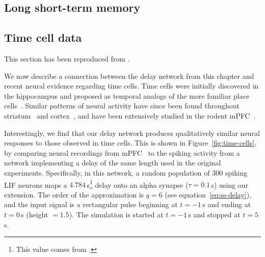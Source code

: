 \subsection{Long short-term memory}
\label{sec:delay-lstm}

\subsection{Time cell data}
\label{sec:time-cells}

This section has been reproduced from \citet{voelker2018}.

We now describe a connection between the delay network from this chapter and recent neural evidence regarding time cells.
Time cells were initially discovered in the hippocampus and proposed as temporal analogs of the more familiar place cells~\citep{eichenbaum2014}.
Similar patterns of neural activity have since been found throughout striatum~\citep{mello2015scalable} and cortex~\citep{luczak2015packet}, and have been extensively studied in the rodent mPFC~\citep{kim2013neural, tiganj2016sequential}.

Interestingly, we find that our delay network produces qualitatively similar neural responses to those observed in time cells.
This is shown in Figure~\ref{fig:time-cells}, by comparing neural recordings from mPFC~\citep[][Figure~4~C,D]{tiganj2016sequential} to the spiking activity from a network implementing a delay of the same length used in the original experiments.
Specifically, in this network, a random population of $300$ spiking LIF neurons maps a $4.784$\,s\footnote{%
This value comes from \citet{tiganj2016sequential}.}
delay onto an alpha synapse ($\tau = 0.1$\,s) using our extension.
The order of the approximation is $q = 6$ (see equation~\ref{eq:ss-delay}), and the input signal is a rectangular pulse beginning at $t = -1$\,s and ending at $t = 0$\,s (height $= 1.5$).
The simulation is started at $t = -1$\,s and stopped at $t = 5$\,s.

